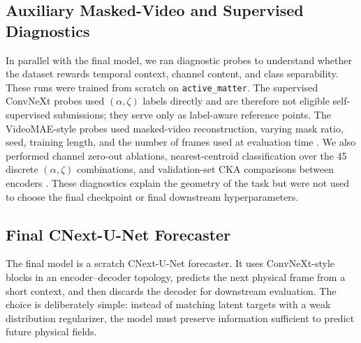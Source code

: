 \documentclass{article}
\begin{document}
\subsection{Auxiliary Masked-Video and Supervised Diagnostics}

In parallel with the final model, we ran diagnostic probes to understand whether the dataset rewards temporal context, channel content, and class separability. These runs were trained from scratch on \texttt{active\_matter}. The supervised ConvNeXt probes used $(\alpha,\zeta)$ labels directly and are therefore not eligible self-supervised submissions; they serve only as label-aware reference points. The VideoMAE-style probes used masked-video reconstruction, varying mask ratio, seed, training length, and the number of frames used at evaluation time \citep{tong2022videomae,he2022mae,xie2022simmim}. We also performed channel zero-out ablations, nearest-centroid classification over the 45 discrete $(\alpha,\zeta)$ combinations, and validation-set CKA comparisons between encoders \citep{kornblith2019cka}. These diagnostics explain the geometry of the task but were not used to choose the final checkpoint or final downstream hyperparameters.

\subsection{Final CNext-U-Net Forecaster}

The final model is a scratch CNext-U-Net forecaster. It uses ConvNeXt-style blocks in an encoder--decoder topology, predicts the next physical frame from a short context, and then discards the decoder for downstream evaluation. The choice is deliberately simple: instead of matching latent targets with a weak distribution regularizer, the model must preserve information sufficient to predict future physical fields.
\end{document}
